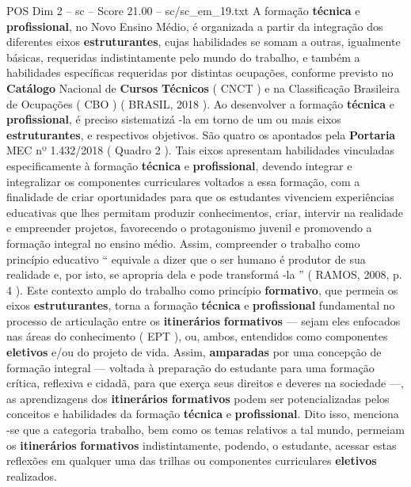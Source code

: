 \begin{textsample}{POS Dim 2 – sc – Score 21.00 – sc/sc\_em\_19.txt}
A formação \textbf{técnica} e \textbf{profissional}, no Novo Ensino Médio, é organizada a partir da integração dos diferentes eixos \textbf{estruturantes}, cujas habilidades se somam a outras, igualmente básicas, requeridas indistintamente pelo mundo do trabalho, e também a habilidades específicas requeridas por distintas ocupações, conforme previsto no \textbf{Catálogo} Nacional de \textbf{Cursos} \textbf{Técnicos} ( CNCT ) e na Classificação Brasileira de Ocupações ( CBO ) ( BRASIL, 2018 ).
Ao desenvolver a formação \textbf{técnica} e \textbf{profissional}, é preciso sistematizá -la em torno de um ou mais eixos \textbf{estruturantes}, e respectivos objetivos.
São quatro os apontados pela \textbf{Portaria} MEC nº 1.432/2018 ( Quadro 2 ).
Tais eixos apresentam habilidades vinculadas especificamente à formação \textbf{técnica} e \textbf{profissional}, devendo integrar e integralizar os componentes curriculares voltados a essa formação, com a finalidade de criar oportunidades para que os estudantes vivenciem experiências educativas que lhes permitam produzir conhecimentos, criar, intervir na realidade e empreender projetos, favorecendo o protagonismo juvenil e promovendo a formação integral no ensino médio.
Assim, compreender o trabalho como princípio educativo “ equivale a dizer que o ser humano é produtor de sua realidade e, por isto, se apropria dela e pode transformá -la ” ( RAMOS, 2008, p. 4 ).
Este contexto amplo do trabalho como princípio \textbf{formativo}, que permeia os eixos \textbf{estruturantes}, torna a formação \textbf{técnica} e \textbf{profissional} fundamental no processo de articulação entre os \textbf{itinerários} \textbf{formativos} — sejam eles enfocados nas áreas do conhecimento ( EPT ), ou, ambos, entendidos como componentes \textbf{eletivos} e/ou do projeto de vida.
Assim, \textbf{amparadas} por uma concepção de formação integral — voltada à preparação do estudante para uma formação crítica, reflexiva e cidadã, para que exerça seus direitos e deveres na sociedade —, as aprendizagens dos \textbf{itinerários} \textbf{formativos} podem ser potencializadas pelos conceitos e habilidades da formação \textbf{técnica} e \textbf{profissional}.
Dito isso, menciona -se que a categoria trabalho, bem como os temas relativos a tal mundo, permeiam os \textbf{itinerários} \textbf{formativos} indistintamente, podendo, o estudante, acessar estas reflexões em qualquer uma das trilhas ou componentes curriculares \textbf{eletivos} realizados.

\end{textsample}
